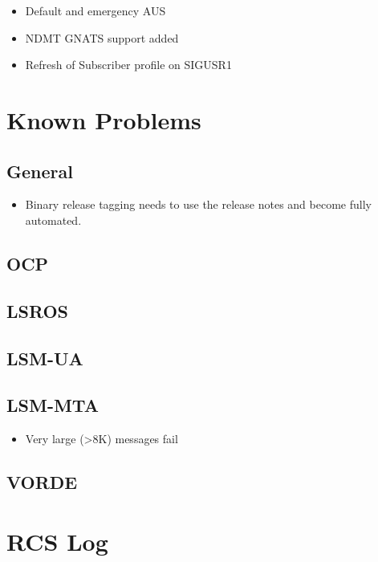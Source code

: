 \begin{itemize}
\item Default and emergency AUS
\item NDMT GNATS support added
\item Refresh of Subscriber profile on SIGUSR1
\end{itemize}

\section*{Known Problems}

\subsection*{General}

\begin{itemize}
\item Binary release tagging needs to use the release notes and
  become fully automated.
\end{itemize}

\subsection*{OCP}

\subsection*{LSROS}

\subsection*{LSM-UA}

\subsection*{LSM-MTA}
\begin{itemize}
\item Very large (>8K) messages fail
\end{itemize}

\subsection*{VORDE}

\section*{RCS Log}

